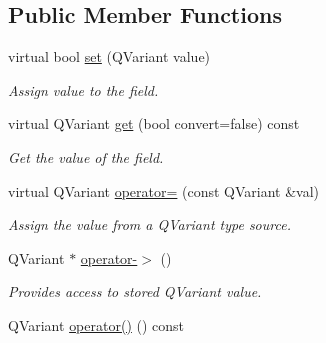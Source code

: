 \subsection*{Public Member Functions}
\begin{DoxyCompactItemize}
\item 
\hypertarget{classDQBaseField_a709e2a9cf4c89158abe94208f329822f}{
virtual bool \hyperlink{classDQBaseField_a709e2a9cf4c89158abe94208f329822f}{set} (QVariant value)}
\label{classDQBaseField_a709e2a9cf4c89158abe94208f329822f}

\begin{DoxyCompactList}\small\item\em Assign value to the field. \item\end{DoxyCompactList}\item 
virtual QVariant \hyperlink{classDQBaseField_a11ae86916807e5c07a7682aa1df5076a}{get} (bool convert=false) const 
\begin{DoxyCompactList}\small\item\em Get the value of the field. \item\end{DoxyCompactList}\item 
\hypertarget{classDQBaseField_a167e675eb89db3668da7cf641efa7347}{
virtual QVariant \hyperlink{classDQBaseField_a167e675eb89db3668da7cf641efa7347}{operator=} (const QVariant \&val)}
\label{classDQBaseField_a167e675eb89db3668da7cf641efa7347}

\begin{DoxyCompactList}\small\item\em Assign the value from a QVariant type source. \item\end{DoxyCompactList}\item 
\hypertarget{classDQBaseField_a4525fb1805a119e1f8a02a3097f8e475}{
QVariant $\ast$ \hyperlink{classDQBaseField_a4525fb1805a119e1f8a02a3097f8e475}{operator-\/$>$} ()}
\label{classDQBaseField_a4525fb1805a119e1f8a02a3097f8e475}

\begin{DoxyCompactList}\small\item\em Provides access to stored QVariant value. \item\end{DoxyCompactList}\item 
\hypertarget{classDQBaseField_a34625c95d2baf6794ab15a2c9adbe59e}{
QVariant \hyperlink{classDQBaseField_a34625c95d2baf6794ab15a2c9adbe59e}{operator()} () const }
\label{classDQBaseField_a34625c95d2baf6794ab15a2c9adbe59e}


\end{DoxyCompactItemize}
